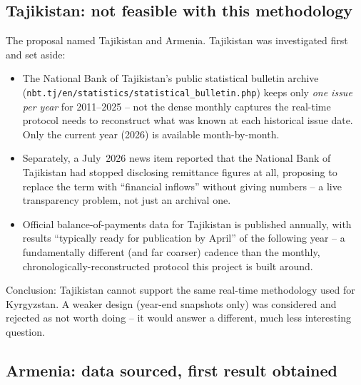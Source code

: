 \documentclass[11pt]{article}
\begin{document}
\subsection{Tajikistan: not feasible with this methodology}
The proposal named Tajikistan and Armenia. Tajikistan was investigated first and set aside:
\begin{itemize}
\item The National Bank of Tajikistan's public statistical bulletin archive
  (\texttt{nbt.tj/en/statistics/\allowbreak statistical\_bulletin.php}) keeps only \emph{one issue per year}
  for 2011--2025 -- not the dense monthly captures the real-time protocol needs to reconstruct
  what was known at each historical issue date. Only the current year (2026) is available
  month-by-month.
\item Separately, a July~2026 news item reported that the National Bank of Tajikistan had
  stopped disclosing remittance figures at all, proposing to replace the term with
  ``financial inflows'' without giving numbers -- a live transparency problem, not just an
  archival one.
\item Official balance-of-payments data for Tajikistan is published annually, with results
  ``typically ready for publication by April'' of the following year -- a fundamentally
  different (and far coarser) cadence than the monthly, chronologically-reconstructed protocol
  this project is built around.
\end{itemize}
Conclusion: Tajikistan cannot support the same real-time methodology used for Kyrgyzstan. A
weaker design (year-end snapshots only) was considered and rejected as not worth doing --
it would answer a different, much less interesting question.

\subsection{Armenia: data sourced, first result obtained}
\end{document}
